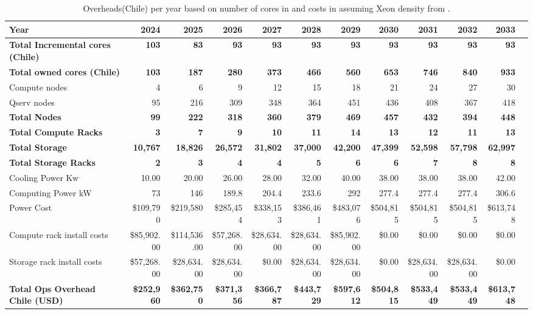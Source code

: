 \tiny \begin{longtable} { |p{}  |r  |r  |r  |r  |r  |r  |r  |r  |r  |r  |r |} 
\caption{Overheads(Chile) per year based on number of cores in  and costs in  assuming Xeon density from .  \label{tab:opsOverheadChile}}\\ 
\hline 
\textbf{Year}&\textbf{2024}&\textbf{2025}&\textbf{2026}&\textbf{2027}&\textbf{2028}&\textbf{2029}&\textbf{2030}&\textbf{2031}&\textbf{2032}&\textbf{2033} \\ \hline
\textbf{Total Incremental cores (Chile)}&\textbf{103}&\textbf{83}&\textbf{93}&\textbf{93}&\textbf{93}&\textbf{93}&\textbf{93}&\textbf{93}&\textbf{93}&\textbf{93} \\ \hline
\textbf{Total owned cores (Chile)}&\textbf{103}&\textbf{187}&\textbf{280}&\textbf{373}&\textbf{466}&\textbf{560}&\textbf{653}&\textbf{746}&\textbf{840}&\textbf{933} \\ \hline
{Compute nodes}&{4}&{6}&{9}&{12}&{15}&{18}&{21}&{24}&{27}&{30} \\ \hline
{Qserv nodes}&{95}&{216}&{309}&{348}&{364}&{451}&{436}&{408}&{367}&{418} \\ \hline
\textbf{Total Nodes}&\textbf{99}&\textbf{222}&\textbf{318}&\textbf{360}&\textbf{379}&\textbf{469}&\textbf{457}&\textbf{432}&\textbf{394}&\textbf{448} \\ \hline
\textbf{Total Compute Racks}&\textbf{3}&\textbf{7}&\textbf{9}&\textbf{10}&\textbf{11}&\textbf{14}&\textbf{13}&\textbf{12}&\textbf{11}&\textbf{13} \\ \hline
\textbf{Total Storage}&\textbf{10,767}&\textbf{18,826}&\textbf{26,572}&\textbf{31,802}&\textbf{37,000}&\textbf{42,200}&\textbf{47,399}&\textbf{52,598}&\textbf{57,798}&\textbf{62,997} \\ \hline
\textbf{Total Storage Racks}&\textbf{2}&\textbf{3}&\textbf{4}&\textbf{4}&\textbf{5}&\textbf{6}&\textbf{6}&\textbf{7}&\textbf{8}&\textbf{8} \\ \hline
{Cooling Power Kw}&{10.00}&{20.00}&{26.00}&{28.00}&{32.00}&{40.00}&{38.00}&{38.00}&{38.00}&{42.00} \\ \hline
{Computing Power kW
}&{73}&{146}&{189.8}&{204.4}&{233.6}&{292}&{277.4}&{277.4}&{277.4}&{306.6} \\ \hline
{Power Cost}&{\$109,790}&{\$219,580}&{\$285,454}&{\$338,153}&{\$386,461}&{\$483,076}&{\$504,815}&{\$504,815}&{\$504,815}&{\$613,748} \\ \hline
{Compute rack install costs}&{\$85,902.00}&{\$114,536.00}&{\$57,268.00}&{\$28,634.00}&{\$28,634.00}&{\$85,902.00}&{\$0.00}&{\$0.00}&{\$0.00}&{\$0.00} \\ \hline
{Storage rack install costs}&{\$57,268.00}&{\$28,634.00}&{\$28,634.00}&{\$0.00}&{\$28,634.00}&{\$28,634.00}&{\$0.00}&{\$28,634.00}&{\$28,634.00}&{\$0.00} \\ \hline
\textbf{Total Ops Overhead Chile (USD)}&\textbf{\$252,960}&\textbf{\$362,750}&\textbf{\$371,356}&\textbf{\$366,787}&\textbf{\$443,729}&\textbf{\$597,612}&\textbf{\$504,815}&\textbf{\$533,449}&\textbf{\$533,449}&\textbf{\$613,748} \\ \hline
\end{longtable} \normalsize
